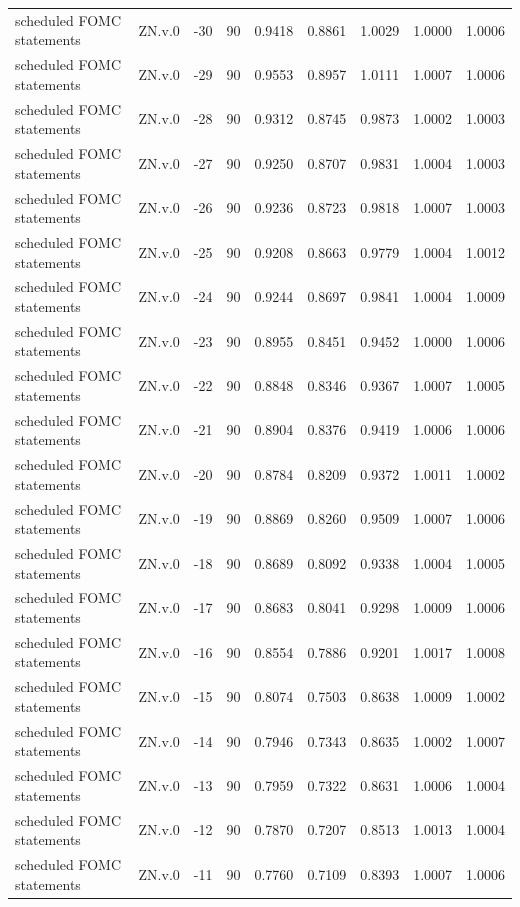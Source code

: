 \begin{tabular}{llrrrrrrr}
scheduled FOMC statements & ZN.v.0 & -30 & 90 & 0.9418 & 0.8861 & 1.0029 & 1.0000 & 1.0006 \\
scheduled FOMC statements & ZN.v.0 & -29 & 90 & 0.9553 & 0.8957 & 1.0111 & 1.0007 & 1.0006 \\
scheduled FOMC statements & ZN.v.0 & -28 & 90 & 0.9312 & 0.8745 & 0.9873 & 1.0002 & 1.0003 \\
scheduled FOMC statements & ZN.v.0 & -27 & 90 & 0.9250 & 0.8707 & 0.9831 & 1.0004 & 1.0003 \\
scheduled FOMC statements & ZN.v.0 & -26 & 90 & 0.9236 & 0.8723 & 0.9818 & 1.0007 & 1.0003 \\
scheduled FOMC statements & ZN.v.0 & -25 & 90 & 0.9208 & 0.8663 & 0.9779 & 1.0004 & 1.0012 \\
scheduled FOMC statements & ZN.v.0 & -24 & 90 & 0.9244 & 0.8697 & 0.9841 & 1.0004 & 1.0009 \\
scheduled FOMC statements & ZN.v.0 & -23 & 90 & 0.8955 & 0.8451 & 0.9452 & 1.0000 & 1.0006 \\
scheduled FOMC statements & ZN.v.0 & -22 & 90 & 0.8848 & 0.8346 & 0.9367 & 1.0007 & 1.0005 \\
scheduled FOMC statements & ZN.v.0 & -21 & 90 & 0.8904 & 0.8376 & 0.9419 & 1.0006 & 1.0006 \\
scheduled FOMC statements & ZN.v.0 & -20 & 90 & 0.8784 & 0.8209 & 0.9372 & 1.0011 & 1.0002 \\
scheduled FOMC statements & ZN.v.0 & -19 & 90 & 0.8869 & 0.8260 & 0.9509 & 1.0007 & 1.0006 \\
scheduled FOMC statements & ZN.v.0 & -18 & 90 & 0.8689 & 0.8092 & 0.9338 & 1.0004 & 1.0005 \\
scheduled FOMC statements & ZN.v.0 & -17 & 90 & 0.8683 & 0.8041 & 0.9298 & 1.0009 & 1.0006 \\
scheduled FOMC statements & ZN.v.0 & -16 & 90 & 0.8554 & 0.7886 & 0.9201 & 1.0017 & 1.0008 \\
scheduled FOMC statements & ZN.v.0 & -15 & 90 & 0.8074 & 0.7503 & 0.8638 & 1.0009 & 1.0002 \\
scheduled FOMC statements & ZN.v.0 & -14 & 90 & 0.7946 & 0.7343 & 0.8635 & 1.0002 & 1.0007 \\
scheduled FOMC statements & ZN.v.0 & -13 & 90 & 0.7959 & 0.7322 & 0.8631 & 1.0006 & 1.0004 \\
scheduled FOMC statements & ZN.v.0 & -12 & 90 & 0.7870 & 0.7207 & 0.8513 & 1.0013 & 1.0004 \\
scheduled FOMC statements & ZN.v.0 & -11 & 90 & 0.7760 & 0.7109 & 0.8393 & 1.0007 & 1.0006 \\

\end{tabular}
